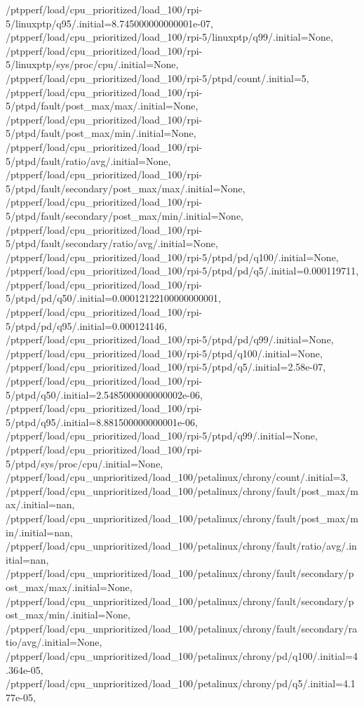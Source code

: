 {    /ptpperf/load/cpu_prioritized/load_100/rpi-5/linuxptp/q95/.initial=8.745000000000001e-07,
    /ptpperf/load/cpu_prioritized/load_100/rpi-5/linuxptp/q99/.initial=None,
    /ptpperf/load/cpu_prioritized/load_100/rpi-5/linuxptp/sys/proc/cpu/.initial=None,
    /ptpperf/load/cpu_prioritized/load_100/rpi-5/ptpd/count/.initial=5,
    /ptpperf/load/cpu_prioritized/load_100/rpi-5/ptpd/fault/post_max/max/.initial=None,
    /ptpperf/load/cpu_prioritized/load_100/rpi-5/ptpd/fault/post_max/min/.initial=None,
    /ptpperf/load/cpu_prioritized/load_100/rpi-5/ptpd/fault/ratio/avg/.initial=None,
    /ptpperf/load/cpu_prioritized/load_100/rpi-5/ptpd/fault/secondary/post_max/max/.initial=None,
    /ptpperf/load/cpu_prioritized/load_100/rpi-5/ptpd/fault/secondary/post_max/min/.initial=None,
    /ptpperf/load/cpu_prioritized/load_100/rpi-5/ptpd/fault/secondary/ratio/avg/.initial=None,
    /ptpperf/load/cpu_prioritized/load_100/rpi-5/ptpd/pd/q100/.initial=None,
    /ptpperf/load/cpu_prioritized/load_100/rpi-5/ptpd/pd/q5/.initial=0.000119711,
    /ptpperf/load/cpu_prioritized/load_100/rpi-5/ptpd/pd/q50/.initial=0.00012122100000000001,
    /ptpperf/load/cpu_prioritized/load_100/rpi-5/ptpd/pd/q95/.initial=0.000124146,
    /ptpperf/load/cpu_prioritized/load_100/rpi-5/ptpd/pd/q99/.initial=None,
    /ptpperf/load/cpu_prioritized/load_100/rpi-5/ptpd/q100/.initial=None,
    /ptpperf/load/cpu_prioritized/load_100/rpi-5/ptpd/q5/.initial=2.58e-07,
    /ptpperf/load/cpu_prioritized/load_100/rpi-5/ptpd/q50/.initial=2.5485000000000002e-06,
    /ptpperf/load/cpu_prioritized/load_100/rpi-5/ptpd/q95/.initial=8.881500000000001e-06,
    /ptpperf/load/cpu_prioritized/load_100/rpi-5/ptpd/q99/.initial=None,
    /ptpperf/load/cpu_prioritized/load_100/rpi-5/ptpd/sys/proc/cpu/.initial=None,
    /ptpperf/load/cpu_unprioritized/load_100/petalinux/chrony/count/.initial=3,
    /ptpperf/load/cpu_unprioritized/load_100/petalinux/chrony/fault/post_max/max/.initial=nan,
    /ptpperf/load/cpu_unprioritized/load_100/petalinux/chrony/fault/post_max/min/.initial=nan,
    /ptpperf/load/cpu_unprioritized/load_100/petalinux/chrony/fault/ratio/avg/.initial=nan,
    /ptpperf/load/cpu_unprioritized/load_100/petalinux/chrony/fault/secondary/post_max/max/.initial=None,
    /ptpperf/load/cpu_unprioritized/load_100/petalinux/chrony/fault/secondary/post_max/min/.initial=None,
    /ptpperf/load/cpu_unprioritized/load_100/petalinux/chrony/fault/secondary/ratio/avg/.initial=None,
    /ptpperf/load/cpu_unprioritized/load_100/petalinux/chrony/pd/q100/.initial=4.364e-05,
    /ptpperf/load/cpu_unprioritized/load_100/petalinux/chrony/pd/q5/.initial=4.177e-05,
}
